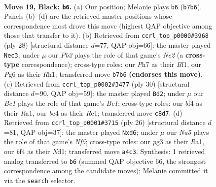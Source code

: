 \documentclass[11pt]{article}
\begin{document}
\clearpage

\begin{figure}[p]\centering
\begin{subfigure}{0.46\textwidth}\centering
\resizebox{\linewidth}{!}{%
\newchessgame
\chessboard[
  setfen={1rb2b1r/1p3k1p/p1n1p1p1/4Pp2/n1B2B2/5NP1/PP1N1P1P/R1K3R1 b - - 3 19},
  showmover=false,
  pgfstyle=straightmove, color=movearrow, markmove={b7-b6}
]}
\caption{}
\end{subfigure}\hfill
\begin{subfigure}{0.46\textwidth}\centering
\resizebox{\linewidth}{!}{%
\newchessgame
\chessboard[
  setfen={r1b1k2r/pp3ppp/2n1pn2/1NP1b3/8/P3BP2/1P2N1PP/R3KB1R w KQkq - 3 15},
  showmover=false,
  pgfstyle=straightmove, color=movearrow, markmove={e2-c3}
]}
\caption{}
\end{subfigure}
\\[4pt]
\begin{subfigure}{0.46\textwidth}\centering
\resizebox{\linewidth}{!}{%
\newchessgame
\chessboard[
  setfen={rn3rk1/1p1bppbp/5np1/1p1P4/7N/2N3P1/PP3PBP/R1B1R1K1 w - - 0 16},
  showmover=false,
  pgfstyle=straightmove, color=movearrow, markmove={c1-d2}
]}
\caption{}
\end{subfigure}\hfill
\begin{subfigure}{0.46\textwidth}\centering
\resizebox{\linewidth}{!}{%
\newchessgame
\chessboard[
  setfen={rn3rk1/p4ppp/b1pb1n2/5N2/Ppp1P3/5P2/1P4PP/R2NKB1R w KQ - 0 14},
  showmover=false,
  pgfstyle=straightmove, color=movearrow, markmove={f5-d6}
]}
\caption{}
\end{subfigure}
\caption{\textbf{Move 19, Black: \texttt{b6}.} (a) Our position; Melanie plays \texttt{b6} (\texttt{b7b6}). Panels (b)--(d) are the retrieved master positions whose correspondence most drove this move (highest QAP objective among those that transfer to it). (b) Retrieved from \texttt{ccrl\_top\_p0000\#3968} (ply 28) [structural distance $d$=77, QAP obj=66]: the master played \texttt{Nec3}; under $\mu$ our \emph{Pb2} plays the role of that game's \emph{Ne2} (a \textbf{cross-type} correspondence); cross-type roles: our \emph{P}h7 as their \emph{B}f1, our \emph{P}g6 as their \emph{R}h1; transferred move \texttt{b7b6} \textbf{(endorses this move)}. (c) Retrieved from \texttt{ccrl\_top\_p0002\#3477} (ply 30) [structural distance $d$=90, QAP obj=59]: the master played \texttt{Bd2}; under $\mu$ our \emph{Bc1} plays the role of that game's \emph{Bc1}; cross-type roles: our \emph{b}f4 as their \emph{R}a1, our \emph{b}c4 as their \emph{R}e1; transferred move \texttt{c8d7}. (d) Retrieved from \texttt{ccrl\_top\_p0001\#3715} (ply 26) [structural distance $d$=81, QAP obj=37]: the master played \texttt{Nxd6}; under $\mu$ our \emph{Na5} plays the role of that game's \emph{Nf5}; cross-type roles: our \emph{p}g3 as their \emph{R}a1, our \emph{b}f4 as their \emph{N}d1; transferred move \texttt{a4c3}. Synthesis: 1 retrieved analog transferred to \texttt{b6} (summed QAP objective 66, the strongest correspondence among the candidate moves); Melanie committed it via the \texttt{search} selector.}
\label{fig:thought-m37}
\end{figure}
\end{document}
